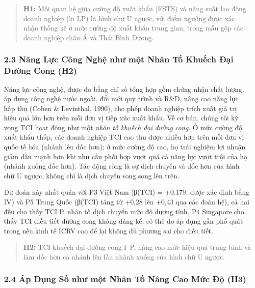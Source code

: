 \documentclass[12pt,a4paper]{article}
\begin{document}
\begin{quote}
\textbf{H1:} Mối quan hệ giữa cường độ xuất khẩu (FSTS) và năng suất lao
động doanh nghiệp (ln LP) là hình chữ U ngược, với điểm ngưỡng được xác
nhận thống kê ở mức cường độ xuất khẩu trung gian, trong mẫu gộp các
doanh nghiệp châu Á và Thái Bình Dương.
\end{quote}

\hypertarget{23-nux103ng-lux1ef1c-cuxf4ng-nghux1ec7-nhux1b0-mux1ed9t-nhuxe2n-tux1ed1-khuux1ebfch-ux111ux1ea1i-ux111ux1b0ux1eddng-cong-h2}{%
\subsubsection{2.3 Năng Lực Công Nghệ như một Nhân Tố Khuếch Đại Đường
Cong
(H2)}\label{23-nux103ng-lux1ef1c-cuxf4ng-nghux1ec7-nhux1b0-mux1ed9t-nhuxe2n-tux1ed1-khuux1ebfch-ux111ux1ea1i-ux111ux1b0ux1eddng-cong-h2}}

Năng lực công nghệ, được đo bằng chỉ số tổng hợp gồm chứng nhận chất
lượng, áp dụng công nghệ nước ngoài, đổi mới quy trình và R\&D, nâng cao
năng lực hấp thụ (Cohen \& Levinthal, 1990), cho phép doanh nghiệp trích
xuất giá trị hiệu quả lớn hơn trên mỗi đơn vị tiếp xúc xuất khẩu. Về cơ
bản, chúng tôi kỳ vọng TCI hoạt động như một \emph{nhân tố khuếch đại
đường cong}. Ở mức cường độ xuất khẩu thấp, các doanh nghiệp TCI cao thu
được nhiều hơn trên mỗi đơn vị quốc tế hóa (nhánh lên dốc hơn); ở mức
cường độ cao, họ trải nghiệm lợi nhuận giảm dần mạnh hơn khi nhu cầu
phối hợp vượt quá cả năng lực vượt trội của họ (nhánh xuống dốc hơn).
Tác động ròng là sự dịch chuyển và dốc hơn của hình chữ U ngược, không
chỉ là dịch chuyển song song lên trên.

Dự đoán này nhất quán với P3 Việt Nam (β(TCI) = +0,179, được xác định
bằng IV) và P5 Trung Quốc (β(TCI) tăng từ +0,28 lên +0,43 qua các đoàn
hệ), cả hai đều cho thấy TCI là nhân tố dịch chuyển mức độ dương tính.
P4 Singapore cho thấy TCI điều tiết đường cong không đáng kể, có thể do
áp dụng gần phổ quát trong nền kinh tế ICRV cao để lại không đủ phương
sai cho điều tiết.

\begin{quote}
\textbf{H2:} TCI khuếch đại đường cong I--P, nâng cao mức hiệu quả trung
bình và làm dốc hơn cả nhánh lên lẫn nhánh xuống của hình chữ U ngược.
\end{quote}

\hypertarget{24-uxe1p-dux1ee5ng-sux1ed1-nhux1b0-mux1ed9t-nhuxe2n-tux1ed1-nuxe2ng-cao-mux1ee9c-ux111ux1ed9-h3}{%
\subsubsection{2.4 Áp Dụng Số như một Nhân Tố Nâng Cao Mức Độ
(H3)}\label{24-uxe1p-dux1ee5ng-sux1ed1-nhux1b0-mux1ed9t-nhuxe2n-tux1ed1-nuxe2ng-cao-mux1ee9c-ux111ux1ed9-h3}}
\end{document}
